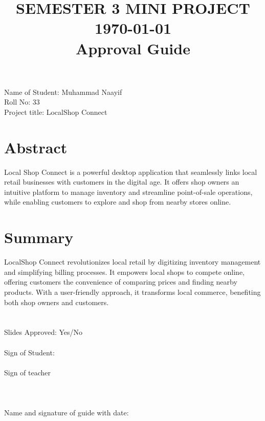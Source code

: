 \documentclass[a4paper]{article} %
\title{SEMESTER 3 MINI PROJECT \today\\Approval Guide}
\author{} %
\date{} %
\begin{document}
\maketitle

\section*{}
Name of Student: Muhammad Naayif\\Roll No: 33\\Project title: LocalShop Connect

\section*{Abstract}
Local Shop Connect is a powerful desktop application that seamlessly links local retail businesses with customers in the digital age. It offers shop owners an intuitive platform to manage inventory and streamline point-of-sale operations, while enabling customers to explore and shop from nearby stores
online.

\section*{Summary}
LocalShop Connect revolutionizes local retail by digitizing inventory management and simplifying billing processes. It empowers local shops to compete online, offering customers the convenience of comparing prices and finding nearby products. With a user-friendly approach, it transforms local commerce, benefiting both shop owners and customers.

\section*{}

Slides Approved: Yes/No\\\\
Sign of Student:\\\\
Sign of teacher\\\\
\section*{}
Name and signature of guide with date: 
\end{document}
